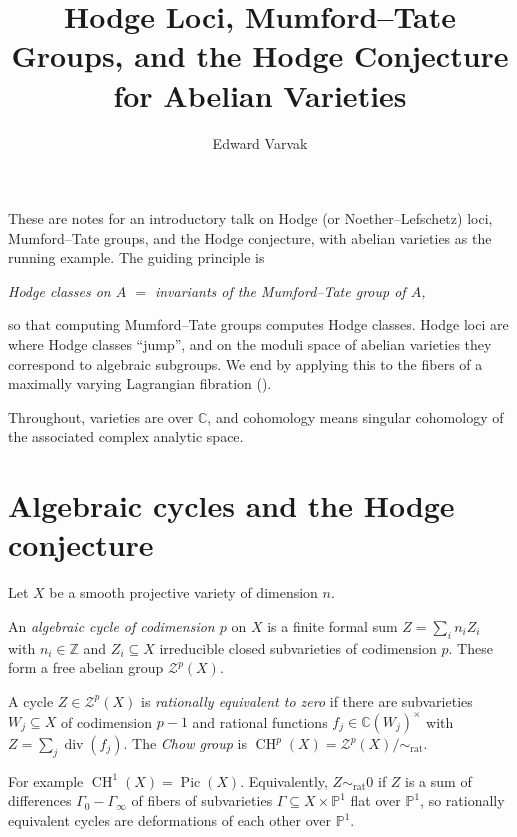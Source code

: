 \documentclass[12pt]{amsart}
\title[Hodge Loci, MT Groups, and the Hodge Conjecture]{Hodge Loci, Mumford--Tate Groups, and the Hodge Conjecture for Abelian Varieties}
\author{Edward Varvak}
\newcommand{\C}{\mathbb{C}}
\newcommand{\Z}{\mathbb{Z}}
\newcommand{\PP}{\mathbb{P}}
\DeclareMathOperator{\CH}{CH}
\DeclareMathOperator{\Pic}{Pic}
\DeclareMathOperator{\divisor}{div}
\theoremstyle{definition}
\theoremstyle{remark}
\numberwithin{equation}{section}
\begin{document}
\maketitle

These are notes for an introductory talk on Hodge (or Noether--Lefschetz) loci,
Mumford--Tate groups, and the Hodge conjecture, with abelian varieties as the
running example. The guiding principle is
\begin{center}
    \emph{Hodge classes on $A$ $=$ invariants of the Mumford--Tate group of $A$,}
\end{center}
so that computing Mumford--Tate groups computes Hodge classes. Hodge loci are
where Hodge classes ``jump'', and on the moduli space of abelian varieties they
correspond to algebraic subgroups. We end by applying this to the fibers of a
maximally varying Lagrangian fibration ().

Throughout, varieties are over $\C$, and cohomology means singular cohomology of
the associated complex analytic space.

\section{Algebraic cycles and the Hodge conjecture}

Let $X$ be a smooth projective variety of dimension $n$.

\begin{definition}
    An \emph{algebraic cycle of codimension $p$} on $X$ is a finite formal sum
    $Z = \sum_i n_i Z_i$ with $n_i \in \Z$ and $Z_i \subseteq X$ irreducible
    closed subvarieties of codimension $p$. These form a free abelian group
    $\mathcal{Z}^p(X)$.
\end{definition}

\begin{definition}
    A cycle $Z \in \mathcal{Z}^p(X)$ is \emph{rationally equivalent to zero} if
    there are subvarieties $W_j \subseteq X$ of codimension $p-1$ and rational
    functions $f_j \in \C(W_j)^\times$ with $Z = \sum_j \divisor(f_j)$. The
    \emph{Chow group} is $\CH^p(X) = \mathcal{Z}^p(X)/\sim_{\mathrm{rat}}$.
\end{definition}

For example $\CH^1(X) = \Pic(X)$. Equivalently, $Z \sim_{\mathrm{rat}} 0$ if
$Z$ is a sum of differences $\Gamma_0 - \Gamma_\infty$ of fibers of
subvarieties $\Gamma \subseteq X \times \PP^1$ flat over $\PP^1$, so rationally
equivalent cycles are deformations of each other over $\PP^1$.
\end{document}
